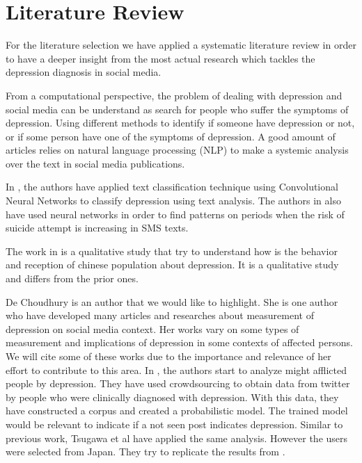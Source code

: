 \chapter{Literature Review}\label{cap:literature_review}

For the literature selection we have applied a systematic literature review in order to have a deeper insight from the most actual research which tackles the depression diagnosis in social media. 

From a computational perspective, the problem of dealing with depression and social media can be understand as search for people who suffer the symptoms of depression. Using different methods to identify if someone have depression or not, or if some person have one of the symptoms of depression. A good amount of articles relies on natural language processing (NLP) to make a systemic analysis over the text in social media publications.

In \cite{Zhao:2018:TCM:3302425.3302501}, the authors have applied text classification technique using Convolutional Neural Networks to classify depression using text analysis. The authors in \cite{Nobles:2018:IIS:3173574.3173987} also have used neural networks in order to find patterns on periods when the risk of suicide attempt is increasing in SMS texts. 

The work in \cite{Li2016} is a qualitative study that try to understand how is the behavior and reception of chinese population about depression. It is a qualitative study and differs from the prior ones.

De Choudhury is an author that we would like to highlight. She is one author who have developed many articles and researches about measurement of depression on social media context. Her works vary on some types of measurement and implications of depression in some contexts of affected persons. We will cite some of these works due to the importance and relevance of her effort to contribute to this area. In \cite{DeChoudhury:2013:SMM:2464464.2464480}, the authors start to analyze might afflicted people by depression. They have used crowdsourcing to obtain data from twitter by people who were clinically diagnosed with depression. With this data, they have constructed a corpus and created a probabilistic model. The trained model would be relevant to indicate if a not seen post indicates depression.
Similar to previous work, Tsugawa et al \cite{Tsugawa2015} have applied the same analysis. However the users were selected from Japan. They try to replicate the results from \cite{DeChoudhury:2013:SMM:2464464.2464480}.


